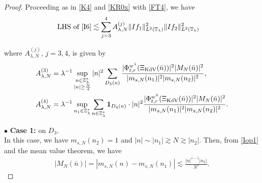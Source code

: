 \documentclass[letterpaper, 11pt,  reqno]{amsart}
\newcommand{\1}{\hspace{0.5mm}\text{I}\hspace{0.5mm}}
\newcommand{\noi}{\noindent}
\newcommand{\Z}{\mathbb{Z}}
\newcommand{\T}{\mathbb{T}}
\newcommand{\ld}{\lambda}
\newcommand{\les}{\lesssim}
\newcommand{\ges}{\gtrsim}
\newcommand{\ind}{\mathbf 1}
\newcommand{\KDV}{\text{\rm KdV} }
\numberwithin{equation}{section}
\numberwithin{theorem}{section}
\begin{document}
\begin{proof}
Proceeding as in \eqref{K4} and \eqref{KR0x}
with \eqref{FT4}, 
we have 
\begin{align*}
\text{LHS of \eqref{I6}}
&\les \sum_{j = 3}^4 
A_{\ld, N}^{(j)} \| I  f_1 \|_{L^2(\T_\ld)}^2 \| I  f_2 \|_{L^2(\T_\ld)}^2
\end{align*}

\noi
where $A_{\ld, N}^{(j)}$, $j =  3, 4$, is given by 
\begin{align}
A_{\ld, N}^{(3)}
& =
 \ld^{-1}\sup_{\substack{n\in \Z_\ld^*\\|n|\geq \frac N4}} |n|^2\sum_{D_3(n)}
 \frac{|\Phi^{w^\ld}_{t,r}(\Xi_\KDV(\bar n)) |^2  |M_N(\bar n)|^2 }{ |m_{s, N}(n_1)|^2|m_{s, N}(n_2)|^2},
\label{I11}\\
A_{\ld, N}^{(4)}
& =
\ld^{-1} 
\sup_{n_1 \in \Z_\ld^*} 
\sum_{n\in \Z_\ld^*} 
\ind_{D_4(n)}\cdot |n|^2 
\frac{ |\Phi^{w^\ld}_{t,r}(\Xi_\KDV(\bar n))|^2 |M_N(\bar n)|^2}{|m_{s, N}(n_1)|^2 |m_{s, N}(n_2)|^2}.
\label{I11a}
\end{align}







%
%


\medskip

\noi
$\bullet$ \textbf{Case 1:} on  $D_3$.\\
\indent
In this case, we have $m_{s, N}(n_2) = 1$
and $|n| \sim |n_1| \ges N \ges |n_2|$.
Then,  from \eqref{Iop1} and the mean value theorem, we have
\begin{align}
|M_N(\bar n)|
= |m_{s, N}(n)-m_{s, N}(n_1)|\les \frac{|n|^{s-1}|n_2|}{N^s}.
\label{I11c}
\end{align}




\end{proof}
\end{document}
